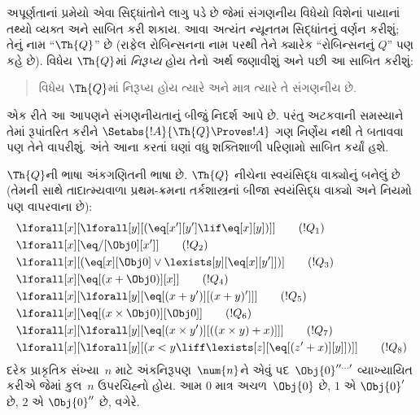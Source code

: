 \OLEndChapterHook
\endgroup


\begingroup
\makeatletter{}\makeatother

\label{guunit:OLP-0289}


\begingroup
\makeatletter{}\makeatother

\label{guunit:OLP-0290}


અપૂર્ણતાનાં પ્રમેયો એવા સિદ્ધાંતોને લાગુ
પડે છે જેમાં સંગણનીય વિધેયો વિશેનાં
પાયાનાં તથ્યો વ્યક્ત અને સાબિત કરી
શકાય. આવા અત્યંત ન્યૂનતમ સિદ્ધાંતનું
વર્ણન કરીશું; તેનું નામ
``$\Th{Q}$'' છે (રાફેલ રોબિન્સનના
નામ પરથી તેને ક્યારેક
``રોબિન્સનનું $Q$'' પણ કહે છે).
વિધેય $\Th{Q}$માં \emph{નિરૂપ્ય}
હોય તેનો અર્થ જણાવીશું અને પછી આ
સાબિત કરીશું:
\begin{quote}
  વિધેય $\Th{Q}$માં નિરૂપ્ય હોય
  ત્યારે અને માત્ર ત્યારે તે સંગણનીય છે.
\end{quote}
એક રીતે આ આપણને સંગણનીયતાનું બીજું
નિદર્શ આપે છે. પરંતુ અટકવાની
સમસ્યાને તેમાં રૂપાંતરિત કરીને
$\Setabs{!A}{\Th{Q} \Proves !A}$
ગણ નિર્ણેય નથી તે બતાવવા પણ તેને
વાપરીશું. અંતે આના કરતાં ઘણાં વધુ
શક્તિશાળી પરિણામો સાબિત કર્યાં હશે.

$\Th{Q}$ની ભાષા અંકગણિતની ભાષા છે.
$\Th{Q}$ નીચેના સ્વયંસિદ્ધ વાક્યોનું
બનેલું છે (તેમની સાથે
તાદાત્મ્યવાળા પ્રથમ-ક્રમના
તર્કશાસ્ત્રનાં બીજા સ્વયંસિદ્ધ વાક્યો
અને નિયમો પણ વાપરવાના છે):
\begin{align*}
& \lforall[x][\lforall[y][(\eq[x'][y'] \lif \eq[x][y])]] \tag{$!Q_1$}\\
& \lforall[x][\eq/[\Obj 0][x']] \tag{$!Q_2$}\\
& \lforall[x][(\eq[x][\Obj 0] \lor \lexists[y][\eq[x][y']])] \tag{$!Q_3$}\\
& \lforall[x][\eq[(x + \Obj 0)][x]] \tag{$!Q_4$}\\
& \lforall[x][\lforall[y][\eq[(x + y')][(x + y)']]] \tag{$!Q_5$}\\
& \lforall[x][\eq[(x \times \Obj 0)][\Obj 0]] \tag{$!Q_6$}\\
& \lforall[x][\lforall[y][\eq[(x \times y')][((x \times y) + x)]]] \tag{$!Q_7$}\\
& \lforall[x][\lforall[y][(x < y \liff \lexists[z][\eq[(z' + x)][y]])]] \tag{$!Q_8$}
\end{align*}
દરેક પ્રાકૃતિક સંખ્યા~$n$ માટે
અંકનિરૂપણ~$\num{n}$ને એવું
પદ~$\Obj{0}^{\prime\prime\ldots\prime}$
વ્યાખ્યાયિત કરીએ જેમાં કુલ~$n$
ઉપરચિહ્નો હોય. આમ $\num{0}$
માત્ર અચળ~$\Obj{0}$ છે,
$\num{1}$ એ $\Obj{0}'$ છે,
$\num{2}$ એ $\Obj{0}''$ છે, વગેરે.

